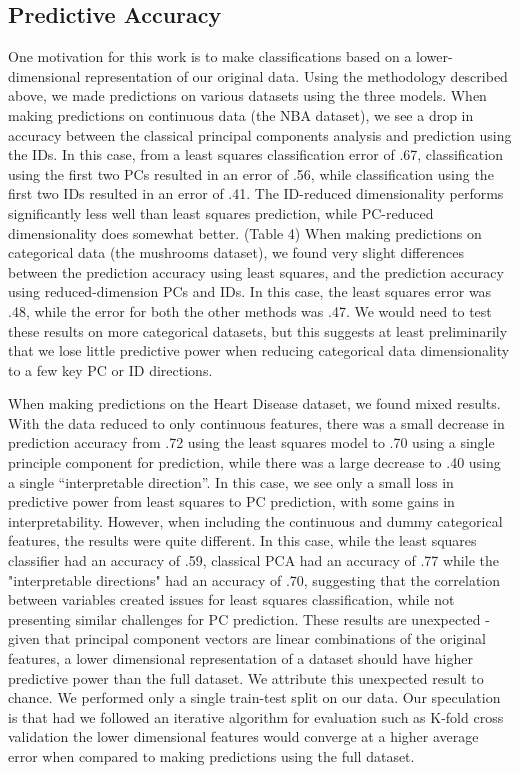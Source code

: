 \documentclass{article}
\begin{document}
{\subsection{Predictive Accuracy}{
One motivation for this work is to make classifications based on a lower-dimensional representation of our original data. Using the methodology described above, we made predictions on various datasets using the three models. 
When making predictions on continuous data (the NBA dataset), we see a drop in accuracy between the classical principal components analysis and prediction using the IDs. In this case, from a least squares classification error of .67, classification using the first two PCs resulted in an error of .56, while classification using the first two IDs resulted in an error of .41. The ID-reduced dimensionality performs significantly less well than least squares prediction, while PC-reduced dimensionality does somewhat better. (Table 4)
When making predictions on categorical data (the mushrooms dataset), we found very slight differences between the prediction accuracy using least squares, and the prediction accuracy using reduced-dimension PCs and IDs. In this case, the least squares error was .48, while the error for both the other methods was .47. We would need to test these results on more categorical datasets, but this suggests at least preliminarily that we lose little predictive power when reducing categorical data dimensionality to a few key PC or ID directions. 

When making predictions on the Heart Disease dataset, we found mixed results. With the data reduced to only continuous features, there was a small decrease in prediction accuracy from .72 using the least squares model to .70 using a single principle component for prediction, while there was a large decrease to .40 using a single “interpretable direction”. In this case, we see only a small loss in predictive power from least squares to PC prediction, with some gains in interpretability. However, when including the continuous and dummy categorical features, the results were quite different. In this case, while the least squares classifier had an accuracy of .59, classical PCA had an accuracy of .77 while the "interpretable directions" had an accuracy of .70, suggesting that the correlation between variables created issues for least squares classification, while not presenting similar challenges for PC prediction. These results are unexpected - given that principal component vectors are linear combinations of the original features, a lower dimensional representation of a dataset should have higher predictive power than the full dataset. We attribute this unexpected result to chance. We performed only a single train-test split on our data. Our speculation is that had we followed an iterative algorithm for evaluation such as K-fold cross validation the lower dimensional features would converge at a higher average error when compared to making predictions using the full dataset.
}

}
\end{document}

